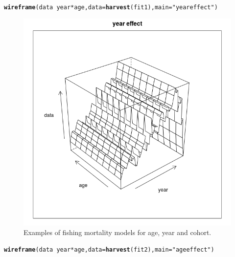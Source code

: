 \documentclass[a4paper,english,10pt]{article}\usepackage[]{graphicx}\usepackage[]{color}
\makeatletter
\def\maxwidth{ %
  \ifdim\Gin@nat@width>\linewidth
    \linewidth
  \else
    \Gin@nat@width
  \fi
}
\newcommand{\hlstr}[1]{\textcolor[rgb]{0.192,0.494,0.8}{#1}}%
\newcommand{\hlopt}[1]{\textcolor[rgb]{0,0,0}{#1}}%
\newcommand{\hlstd}[1]{\textcolor[rgb]{0.345,0.345,0.345}{#1}}%
\newcommand{\hlkwc}[1]{\textcolor[rgb]{0.333,0.667,0.333}{#1}}%
\newcommand{\hlkwd}[1]{\textcolor[rgb]{0.737,0.353,0.396}{\textbf{#1}}}%
\newenvironment{kframe}{%
 \def\at@end@of@kframe{}%
 \ifinner\ifhmode%
  \def\at@end@of@kframe{\end{minipage}}%
  \begin{minipage}{\columnwidth}%
 \fi\fi%
 \def\FrameCommand##1{\hskip\@totalleftmargin \hskip-\fboxsep
 \colorbox{shadecolor}{##1}\hskip-\fboxsep
     \hskip-\linewidth \hskip-\@totalleftmargin \hskip\columnwidth}%
 \MakeFramed {\advance\hsize-\width
   \@totalleftmargin\z@ \linewidth\hsize
   \@setminipage}}%
 {\par\unskip\endMakeFramed%
 \at@end@of@kframe}
\newenvironment{knitrout}{}{} %
\makeatother
\begin{document}
\begin{knitrout}
\color{fgcolor}\begin{kframe}
\begin{alltt}
\hlkwd{wireframe}\hlstd{(data} \hlopt{~} \hlstd{year} \hlopt{*} \hlstd{age,} \hlkwc{data} \hlstd{=} \hlkwd{harvest}\hlstd{(fit1),} \hlkwc{main} \hlstd{=} \hlstr{"year effect"}\hlstd{)}
\end{alltt}
\end{kframe}\begin{figure}[H]

{\centering \includegraphics[width=\maxwidth]{figure/majeff-1} 

}

\caption[Examples of fishing mortality models for age, year and cohort]{Examples of fishing mortality models for age, year and cohort.}\label{fig:majeff1}
\end{figure}

\begin{kframe}\begin{alltt}
\hlkwd{wireframe}\hlstd{(data} \hlopt{~} \hlstd{year} \hlopt{*} \hlstd{age,} \hlkwc{data} \hlstd{=} \hlkwd{harvest}\hlstd{(fit2),} \hlkwc{main} \hlstd{=} \hlstr{"age effect"}\hlstd{)}
\end{alltt}
\end{kframe}\begin{figure}[H]


\end{figure}
\end{knitrout}
\end{document}
